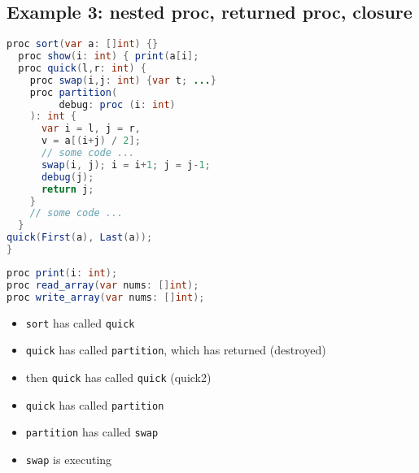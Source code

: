 \documentclass[10pt,a4paper,landscape]{article}
\begin{document}
\begin{multicols*}{3}
\section*{Example 3: nested proc, returned proc, closure}
\begin{minipage}{.58\linewidth}
  \begin{lstlisting}[language=java,xleftmargin=-2em,frame=none]
proc sort(var a: []int) {}
  proc show(i: int) { print(a[i];
  proc quick(l,r: int) {
    proc swap(i,j: int) {var t; ...}
    proc partition(
         debug: proc (i: int)
    ): int {
      var i = l, j = r,
      v = a[(i+j) / 2];
      // some code ...
      swap(i, j); i = i+1; j = j-1;
      debug(j);
      return j;
    }
    // some code ...
  }
quick(First(a), Last(a));
}
\end{lstlisting}
\end{minipage}
\begin{minipage}{.42\linewidth}
\begin{lstlisting}[language=java,frame=none]
proc print(i: int);
proc read_array(var nums: []int);
proc write_array(var nums: []int);
\end{lstlisting}
  \flushleft
  \begin{itemize}
  \item \texttt{sort} has called \texttt{quick}
  \item \texttt{quick} has called \texttt{partition}, which has returned (destroyed)
  \item then \texttt{quick} has called \texttt{quick} (quick2)
  \item \texttt{quick} has called \texttt{partition}
  \item \texttt{partition} has called \texttt{swap}
  \item \texttt{swap} is executing
  \end{itemize}
\end{minipage}
\begin{minipage}{\linewidth}
  \centering
\end{minipage}
\end{multicols*}
\end{document}
